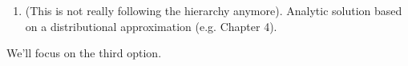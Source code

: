 \documentclass{article}
\makeatletter
\newcommand{\@giventhatstar}[2]{#1\,\middle|\,#2}
\newcommand{\@giventhatnostar}[3][]{#1(#2\,#1|\,#3#1)}
\newcommand{\giventhat}{\@ifstar\@giventhatstar\@giventhatnostar}
\newcommand{\pdens}[1]{\text{p}\left( #1 \right)}
\makeatother
\begin{document}
\begin{enumerate}
		Thought exercise, reconcile the quadrature vs simulation formulas.
		As a reminder in the quadrature world we have
		\begin{equation}
			\frac{\sum _{s = 1} ^S w_s q\left( \giventhat*{\theta ^s}{y} h\left( \theta ^s \right) \right)}{\sum _{s = 1} ^S w_s q\left( \giventhat*{\theta ^s}{y} \right)} \approx \sum _{s = 1} ^S w_s \pdens{\giventhat*{\theta ^s}{y}} h\left( \theta ^s \right)
		\end{equation}
		where $\theta ^s$ are deterministically spaced.
	\item
		(This is not really following the hierarchy anymore). Analytic solution based on a distributional approximation (e.g. Chapter 4).
\end{enumerate}

We'll focus on the third option.
\end{document}
